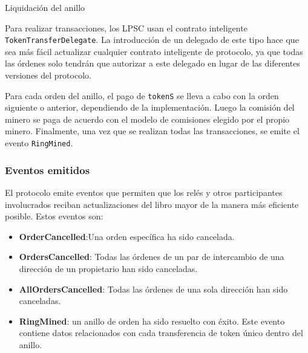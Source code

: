 \documentclass[UTF8,nofonts]{article}
\makeatletter
\newenvironment{figurehere}
 {\def\@captype{figure}}
 {}
\makeatother
\begin{document}
\begin{multicols}{2}
\begin{center}
\begin{figurehere}
\caption{Liquidaci\'on del anillo}
\label{fig:settlement}
\end{figurehere}
\end{center}

Para realizar transacciones, los LPSC usan el contrato inteligente \verb|TokenTransferDelegate|. La introducci\'on de un delegado de este tipo hace que sea m\'as f\'acil actualizar cualquier contrato inteligente de protocolo, ya que todas las \'ordenes solo tendr\'an que autorizar a este delegado en lugar de las diferentes versiones del protocolo.


Para cada orden del anillo, el pago de \verb|tokenS| se lleva a cabo con la orden siguiente o anterior, dependiendo de la implementaci\'on. Luego la comisi\'on del minero se paga de acuerdo con el modelo de comisiones elegido por el propio minero. Finalmente, una vez que se realizan todas las transacciones, se emite el evento \verb|RingMined|.


\subsubsection{Eventos emitidos\label{sec:events}}

El protocolo emite eventos que permiten que los rel\'es y otros participantes involucrados reciban actualizaciones del libro mayor de la manera m\'as eficiente posible. Estos eventos son:

\begin{itemize}
	\item \textbf{OrderCancelled}:Una orden espec\'ifica ha sido cancelada.
	\item \textbf{OrdersCancelled}: Todas las \'ordenes de un par de intercambio de una direcci\'on de un propietario han sido canceladas.
	\item \textbf{AllOrdersCancelled}: Todas las \'ordenes de una sola direcci\'on han sido canceladas.
	\item \textbf{RingMined}: un anillo de orden ha sido resuelto con \'exito. Este evento contiene datos relacionados con cada transferencia de token \'unico dentro del anillo.
\end{itemize}


\end{multicols}
\end{document}
